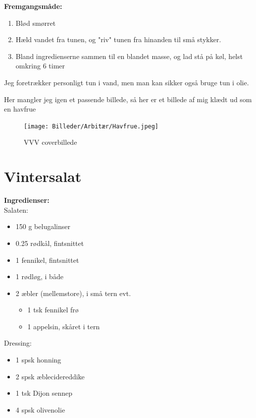 \documentclass{book}
\begin{document}
\begin{minipage}[t]{0.5\textwidth}
\textbf{Fremgangsmåde:}
\begin{enumerate}
    \item Blød smørret
    \item Hæld vandet fra tunen, og "riv" tunen fra hinanden til små stykker.
    \item Bland ingredienserne sammen til en blandet masse, og lad stå på køl, helst omkring 6 timer
\end{enumerate}
\end{minipage}
Jeg foretrækker personligt tun i vand, men man kan sikker også bruge tun i olie.

\newpage Her mangler jeg igen et passende billede, så her er et billede af mig klædt ud som en havfrue\begin{figure}
    \centering
    \texttt{[image: Billeder/Arbitær/Havfrue.jpeg]}
    \caption{VVV coverbillede}
    
\end{figure}
\newpage \section{Vintersalat}
\begin{minipage}[t]{0.5\textwidth}
\textbf{Ingredienser:}
\\ Salaten: 
\begin{itemize}
    \item 150 g belugalinser
    \item 0.25 rødkål, fintsnittet
    \item 1 fennikel, fintsnittet
    \item 1 rødløg, i både
    \item 2 æbler (mellemstore), i små tern
    evt.
    \begin{itemize}
        \item 1 tsk fennikel frø
        \item 1 appelsin, skåret i tern
    \end{itemize}
\end{itemize}
Dressing:
\begin{itemize}
    \item 1 spsk honning
    \item 2 spsk æblecidereddike
    \item 1 tsk Dijon sennep
    \item 4 spsk olivenolie
\end{itemize}
\end{minipage}
\end{document}
